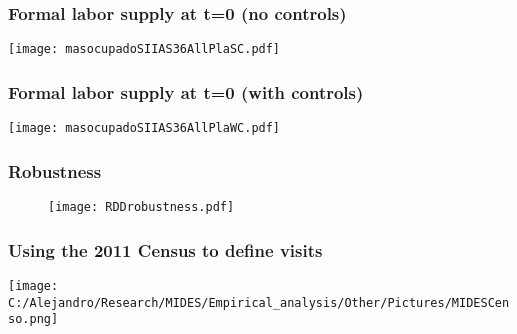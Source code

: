 \documentclass{beamer}
\begin{document}
\begin{frame}[shrink=5, label=masocupadoSIIAS36AllPlaSC]
\frametitle{Formal labor supply at t=0 (no controls)}
\begin{center}
\texttt{[image: masocupadoSIIAS36AllPlaSC.pdf]}
\label{masocupadoSIIAS36AllPlaSC}
\end{center}
\hyperlink{masocupadoSIIAS36AllWC}{}
\end{frame}

\begin{frame}[shrink=5, label=masocupadoSIIAS36AllPlaWC]
\frametitle{Formal labor supply at t=0 (with controls)}
\begin{center}
\texttt{[image: masocupadoSIIAS36AllPlaWC.pdf]}
\label{masocupadoSIIAS36AllPlaWC}
\end{center}
\hyperlink{masocupadoSIIAS36AllWC}{}
\end{frame}

\begin{frame}[label=RDDrobustness]
\frametitle{Robustness}
\begin{figure}
	\texttt{[image: RDDrobustness.pdf]}
	\label{RDDrobustness}
\end{figure}
\hyperlink{FRDDLabor}{}
\end{frame}

\begin{frame}[label=MIDESCenso]
\frametitle{Using the 2011 Census to define visits}
\begin{center}
	\texttt{[image: C:/Alejandro/Research/MIDES/Empirical\_analysis/Other/Pictures/MIDESCenso.png]}
	\label{MIDESCenso}
\end{center}
\hyperlink{nHouse}{}
\end{frame}
\end{document}
